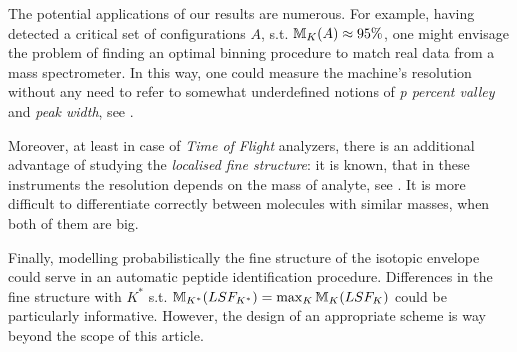 	The potential applications of our results are numerous. For example, having detected a critical set of configurations $A$, s.t. $\mathbb{M}_K(A) \approx 95\%$, one might envisage the problem of finding an optimal binning procedure to match real data from a mass spectrometer. In this way, one could measure the machine's resolution without any need to refer to somewhat underdefined notions of {\it p percent valley} and {\it peak width}, see \cite{Eidhammer2008ComputationalMethodsInMassSpectrometry}. 


	Moreover, at least in case of {\it Time of Flight} analyzers, there is an additional advantage of studying the {\it localised fine structure}: it is known, that in these instruments the resolution depends on the mass of analyte, see \cite{Eidhammer2008ComputationalMethodsInMassSpectrometry}. It is more difficult to differentiate correctly between molecules with similar masses, when both of them are big. 











	Finally, modelling probabilistically the fine structure of the isotopic envelope could serve in an automatic peptide identification procedure. Differences in the fine structure with $K^*$ s.t. $\mathbb{M}_{K^*}(LSF_{K^*}) = \max_K \mathbb{M}_K(LSF_K)$ could be particularly informative. However, the design of an appropriate scheme is way beyond the scope of this article.